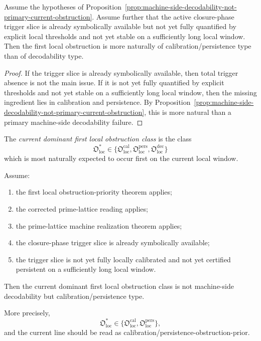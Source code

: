 \begin{proposition}
\label{prop:current-obstruction-split-is-calibration-persistence-dominant}
Assume the hypotheses of Proposition~\ref{prop:machine-side-decodability-not-primary-current-obstruction}.
Assume further that the active closure-phase trigger slice is already symbolically available but not yet fully quantified by explicit local thresholds and not yet stable on a sufficiently long local window.
Then the first local obstruction is more naturally of calibration/persistence type than of decodability type.
\end{proposition}

\begin{proof}
If the trigger slice is already symbolically available, then total trigger absence is not the main issue.
If it is not yet fully quantified by explicit thresholds and not yet stable on a sufficiently long local window, then the missing ingredient lies in calibration and persistence.
By Proposition~\ref{prop:machine-side-decodability-not-primary-current-obstruction}, this is more natural than a primary machine-side decodability failure.
\end{proof}

\begin{definition}
\label{def:current-dominant-first-local-obstruction-class}
The \emph{current dominant first local obstruction class} is the class
\[
\mathfrak{O}_{\mathrm{loc}}^{\ast}
\in
\{
\mathfrak{O}_{\mathrm{loc}}^{\mathrm{cal}},
\mathfrak{O}_{\mathrm{loc}}^{\mathrm{pers}},
\mathfrak{O}_{\mathrm{loc}}^{\mathrm{dec}}
\}
\]
which is most naturally expected to occur first on the current local window.
\end{definition}

\begin{theorem}
\label{thm:first-local-obstruction-classification-theorem}
Assume:
\begin{enumerate}
 \item the first local obstruction-priority theorem applies;
 \item the corrected prime-lattice reading applies;
 \item the prime-lattice machine realization theorem applies;
 \item the closure-phase trigger slice is already symbolically available;
 \item the trigger slice is not yet fully locally calibrated and not yet certified persistent on a sufficiently long local window.
\end{enumerate}
Then the current dominant first local obstruction class is not machine-side decodability but calibration/persistence type.

More precisely,
\[
\mathfrak{O}_{\mathrm{loc}}^{\ast}
\in
\{
\mathfrak{O}_{\mathrm{loc}}^{\mathrm{cal}},
\mathfrak{O}_{\mathrm{loc}}^{\mathrm{pers}}
\},
\]
and the current line should be read as calibration/persistence-obstruction-prior.
\end{theorem}

